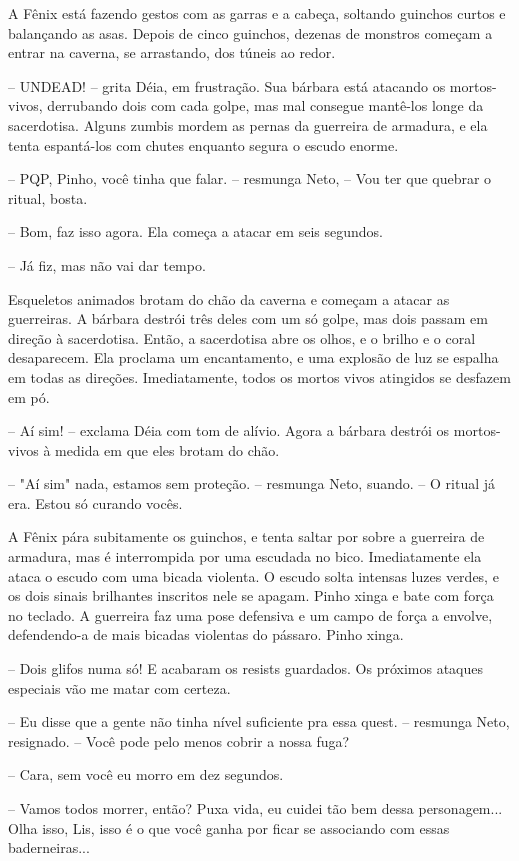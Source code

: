 A Fênix está fazendo gestos com as garras e a cabeça, soltando guinchos curtos e balançando as asas.
Depois de cinco guinchos, dezenas de monstros começam a entrar na caverna, se arrastando, dos túneis ao redor.

-- UNDEAD! -- grita Déia, em frustração. Sua bárbara está atacando os mortos-vivos, derrubando dois com cada golpe, 
mas mal consegue mantê-los longe da sacerdotisa. 
Alguns zumbis mordem as pernas da guerreira de armadura, e ela tenta espantá-los com chutes enquanto segura o escudo enorme.

-- PQP, Pinho, você tinha que falar. -- resmunga Neto, -- Vou ter que quebrar o ritual, bosta.

-- Bom, faz isso agora. Ela começa a atacar em seis segundos.

-- Já fiz, mas não vai dar tempo.

Esqueletos animados brotam do chão da caverna e começam a atacar as guerreiras. A bárbara destrói três deles com um só golpe,
mas dois passam em direção à sacerdotisa. 
Então, a sacerdotisa abre os olhos, e o brilho e o coral
desaparecem. Ela proclama um encantamento, e uma explosão de luz se espalha em todas as direções. Imediatamente,
todos os mortos vivos atingidos se desfazem em pó.

-- Aí sim! -- exclama Déia com tom de alívio. Agora a bárbara destrói os mortos-vivos à medida em que eles brotam do chão.

-- "Aí sim" nada, estamos sem proteção. -- resmunga Neto, suando. -- O ritual já era. Estou só curando vocês.

A Fênix pára subitamente os guinchos, e tenta saltar por sobre a guerreira de armadura, mas é interrompida por uma escudada no bico.
Imediatamente ela ataca o escudo com uma bicada violenta. O escudo solta intensas luzes verdes, e os dois sinais
brilhantes inscritos nele se apagam. Pinho xinga e bate com força no teclado. A guerreira faz uma pose defensiva e um campo de força a envolve,
defendendo-a de mais bicadas violentas do pássaro. Pinho xinga.

-- Dois glifos numa só! E acabaram os resists guardados. Os próximos ataques especiais vão me matar com certeza.

-- Eu disse que a gente não tinha nível suficiente pra essa quest. -- resmunga Neto, resignado. -- Você pode pelo menos cobrir a nossa fuga?

-- Cara, sem você eu morro em dez segundos.

-- Vamos todos morrer, então? Puxa vida, eu cuidei tão bem dessa personagem... Olha isso, Lis, isso é o que você ganha por ficar se associando
com essas baderneiras...

